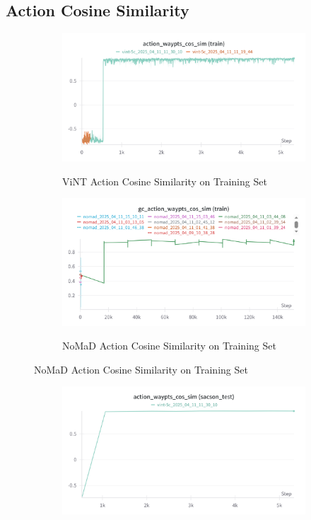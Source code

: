 \documentclass[12pt]{article}
\begin{document}
\begin{appendices}
\subsection*{Action Cosine Similarity}
\begin{figure}[H]
    \centering
    \begin{subfigure}[b]{0.48\textwidth}
        \centering
        \includegraphics[width=\textwidth]{images/action_sim_train_vint.png}
        \label{fig:action_train_vint}
        \caption{ViNT Action Cosine Similarity on Training Set}
    \end{subfigure}
    \hfill
    \begin{subfigure}[b]{0.48\textwidth}
        \centering
        \includegraphics[width=\textwidth]{images/gc_action_waypts_cos_sim_train.png}
        \label{fig:action_train_nomad}
        \caption{NoMaD Action Cosine Similarity on Training Set}
    \end{subfigure}
\end{figure}
\begin{figure}[H]
    \centering
    \begin{subfigure}[b]{0.48\textwidth}
        \centering
        \includegraphics[width=\textwidth]{images/action_sim_test_vint.png}

\end{subfigure}
\end{figure}
\end{appendices}
\end{document}
